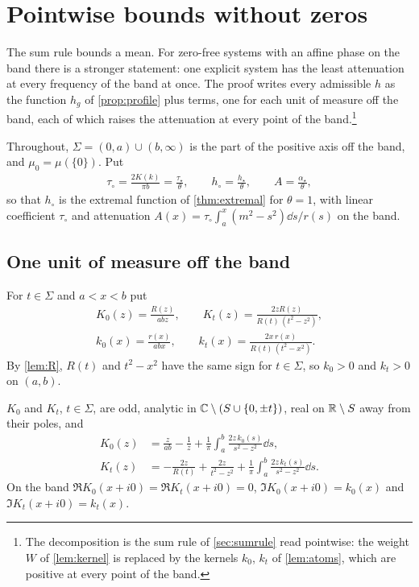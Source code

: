 \section{Pointwise bounds without zeros}\label{sec:pointwise}

The sum rule bounds a mean. For zero-free systems with an affine phase on
the band there is a stronger statement: one explicit system has the least
attenuation at every frequency of the band at once. The proof writes every
admissible $h$ as the function $h_g$ of \cref{prop:profile} plus terms, one
for each unit of measure off the band, each of which raises the attenuation
at every point of the band.\footnote{The decomposition is the sum rule of
\cref{sec:sumrule} read pointwise: the weight $W$ of \cref{lem:kernel} is
replaced by the kernels $k_0$, $k_t$ of \cref{lem:atoms}, which are positive
at every point of the band.}

Throughout, $\Sigma=(0,a)\cup(b,\infty)$ is the part of the positive axis
off the band, and $\mu_0=\mu(\{0\})$. Put
\begin{gather*}
\tau_\circ=\frac{2K(k)}{\pi b}=\frac{\tau_\star}\theta,\qquad
h_\circ=\frac{h_\star}\theta,\qquad A=\frac{\alpha_\star}\theta,
\end{gather*}
so that $h_\circ$ is the extremal function of \cref{thm:extremal} for
$\theta=1$, with linear coefficient $\tau_\circ$ and attenuation
$A(x)=\tau_\circ\int_a^x(m^2-s^2)\dd s/r(s)$ on the band.

\subsection{One unit of measure off the band}

For $t\in\Sigma$ and $a<x<b$ put
\begin{gather*}
K_0(z)=\frac{R(z)}{abz},\qquad
K_t(z)=\frac{2zR(z)}{R(t)\,(t^2-z^2)},\\
k_0(x)=\frac{r(x)}{abx},\qquad
k_t(x)=\frac{2x\,r(x)}{R(t)\,(t^2-x^2)} .
\end{gather*}
By \cref{lem:R}, $R(t)$ and $t^2-x^2$ have the same sign for $t\in\Sigma$,
so $k_0>0$ and $k_t>0$ on $(a,b)$.

\begin{lemma}\label{lem:atoms}
$K_0$ and $K_t$, $t\in\Sigma$, are odd, analytic in $\mathbb C\setminus(S\cup\{0,\pm t\})$,
real on $\mathbb R\setminus S$ away from their poles, and
\begin{align*}
K_0(z)&=\frac z{ab}-\frac1z+\frac1\pi\int_a^b\frac{2z\,k_0(s)}{s^2-z^2}\dd s,\\
K_t(z)&=-\frac{2z}{R(t)}+\frac{2z}{t^2-z^2}
+\frac1\pi\int_a^b\frac{2z\,k_t(s)}{s^2-z^2}\dd s .
\end{align*}
On the band $\Re K_0(x+i0)=\Re K_t(x+i0)=0$, $\Im K_0(x+i0)=k_0(x)$ and
$\Im K_t(x+i0)=k_t(x)$.
\end{lemma}

